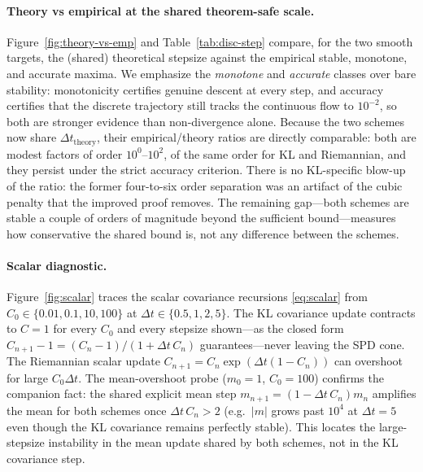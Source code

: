 \documentclass[11pt]{article}
\begin{document}
\paragraph{Theory vs empirical at the shared theorem-safe scale.}
Figure~\ref{fig:theory-vs-emp} and Table~\ref{tab:disc-step} compare, for the two
smooth targets, the (shared) theoretical stepsize against the empirical stable,
monotone, and accurate maxima. We emphasize the \emph{monotone} and \emph{accurate}
classes over bare stability: monotonicity certifies genuine descent at every step,
and accuracy certifies that the discrete trajectory still tracks the continuous
flow to $10^{-2}$, so both are stronger evidence than non-divergence alone. Because
the two schemes now share $\Delta t_{\mathrm{theory}}$, their empirical/theory
ratios are directly comparable: both are modest factors of order
$10^{0}$--$10^{2}$, of the same order for KL and Riemannian, and they persist under
the strict accuracy criterion. There is no KL-specific blow-up of the ratio: the
former four-to-six order separation was an artifact of the cubic penalty that the
improved proof removes. The remaining gap---both schemes are stable a couple of
orders of magnitude beyond the sufficient bound---measures how conservative the
shared bound is, not any difference between the schemes.

\begin{table}[t]
\centering
\caption{Empirical vs theoretical maximum stepsize by target/$\lambda$/method,
against the shared theorem-safe stepsize $\Delta t_{\mathrm{theory}}=1/(\beta\lambda_{\max})$,
reporting the largest stable, monotone, and accurate stepsizes and the
monotone/theory and accurate/theory ratios. The ratios are modest
($10^{0}$--$10^{2}$) and of the same order for KL and Riemannian; the gap survives
the strict accuracy criterion, not just bare stability.}
\label{tab:disc-step}
\end{table}

\paragraph{Scalar diagnostic.}
Figure~\ref{fig:scalar} traces the scalar covariance recursions \eqref{eq:scalar}
from $C_0\in\{0.01,0.1,10,100\}$ at $\Delta t\in\{0.5,1,2,5\}$. The KL covariance
update contracts to $C=1$ for every $C_0$ and every stepsize shown---as the closed
form $C_{n+1}-1=(C_n-1)/(1+\Delta t\,C_n)$ guarantees---never leaving the SPD cone.
The Riemannian scalar update $C_{n+1}=C_n\exp(\Delta t(1-C_n))$ can overshoot for
large $C_0\Delta t$. The mean-overshoot probe ($m_0=1$, $C_0=100$) confirms the
companion fact: the shared explicit mean step $m_{n+1}=(1-\Delta t\,C_n)m_n$
amplifies the mean for both schemes once $\Delta t\,C_n>2$ (e.g.\ $|m|$ grows past
$10^4$ at $\Delta t=5$ even though the KL covariance remains perfectly stable).
This locates the large-stepsize instability in the mean update shared by both
schemes, not in the KL covariance step.
\end{document}
